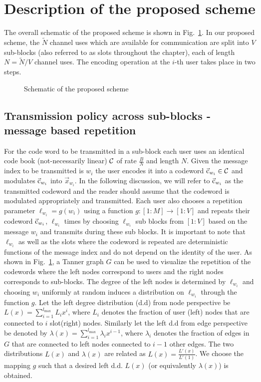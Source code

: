 \section{Description of the proposed scheme}
The overall schematic of the proposed scheme is shown in Fig.~\ref{fig:overallscheme}. In our proposed scheme, the $\tilde{N}$ channel uses which are available for communication are split into $V$ sub-blocks (also referred to as slots throughout the chapter), each of length $N=\tilde{N}/V$ channel uses. The encoding operation at the $i$-th user takes place in two steps.

\begin{figure}[h]
  \centering
  \resizebox{0.9\textwidth}{!}{}
  \caption{Schematic of the proposed scheme}
  \label{fig:overallscheme}
\end{figure}

\subsection{Transmission policy across sub-blocks - message based repetition}
\label{sec:Txpolicy_TannerGraph}
For the code word to be transmitted in a sub-block each user uses an identical code book (not-necessarily linear) $\mathcal{C}$ of rate $\frac{B}{N}$ and length $N$. Given the message index to be transmitted is $w_i$ the user encodes it into a codeword $\vec{\mathrm{c}}_{w_i} \in \mathcal{C}$ and modulates $\vec{\mathrm{c}}_{w_i}$ into $\vec{x}_{w_i}$. In the following discussion, we will refer to $\vec{\mathrm{c}}_{w_i}$ as the transmitted codeword and the reader should assume that the codeword is modulated appropriately and transmitted. Each user also chooses a repetition parameter $\ell_{w_i}=g(w_i)$ using a function $g:[1:M] \rightarrow [1:V]$ and repeats their codeword $\vec{\mathrm{c}}_{w_i}$, $\ell_{w_i}$ times by choosing $\ell_{w_i}$ sub blocks from $[1:V]$ based on the message $w_i$ and transmits during these sub blocks. It is important to note that $\ell_{w_i}$ as well as the slots where the codeword is repeated are deterministic functions of the message index and do not depend on the identity of the user. As shown in Fig.~\ref{fig:overallscheme}, a Tanner graph $G$ can be used to visualize the repetition of the codewords where the left nodes correspond to users and the right nodes corresponds to sub-blocks. The degree of the left nodes is determined by $\ell_{w_i}$ and choosing $w_i$ uniformly at random induces a distribution on $\ell_{w_i}$ through the function $g$.  Let the left degree distribution (d.d) from node perspective be $L(x) = \sum_{{i=1}}^{{l_{\max}}} L_i x^i$, where $L_i$ denotes the fraction of user (left) nodes that are connected to $i$ slot(right) nodes. Similarly let the left d.d from edge perspective be denoted by $\lambda(x) = \sum_{{i=1}}^{{l_{\max}}} \lambda_i x^{i-1}$, where $\lambda_i$ denotes the fraction of edges in $G$ that are connected to left nodes connected to $i-1$ other edges. The two distributions $L(x)$ and $\lambda(x)$ are related as $L(x)=\frac{L'(x)}{L'(1)}$. We choose the mapping $g$ such that a desired left d.d. $L(x)$ (or equivalently $\lambda(x)$) is obtained.

